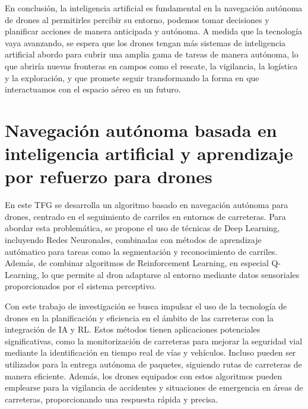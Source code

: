 En conclusión, la inteligencia artificial es fundamental en la navegación autónoma de drones al permitirles percibir su entorno, podemos tomar decisiones y planificar acciones 
de manera anticipada y autónoma. A medida que la tecnología vaya avanzando, se espera que los drones tengan más sistemas de inteligencia artificial abordo para cubrir una amplia gama de tareas
de manera autónoma, lo que abriría nuevas fronteras en campos como el rescate, la vigilancia, la logística y la exploración, y que promete seguir transformando la forma en que 
interactuamos con el espacio aéreo en un futuro. 

\section{Navegación autónoma basada en inteligencia artificial y aprendizaje por refuerzo para drones}
\label{sec:Navegación autónoma}

En este TFG se desarrolla un algoritmo basado en navegación autónoma para drones, centrado en el seguimiento de carriles en entornos de carreteras. Para abordar esta problemática, se propone 
el uso de técnicas de Deep Learning, incluyendo Redes Neuronales, combinadas con métodos de aprendizaje autómatico para tareas como la segmentación y reconocimiento de carriles. Además, 
de combinar algoritmos de Reinforcement Learning, en especial Q-Learning, lo que permite al dron adaptarse al entorno mediante datos sensoriales proporcionados por el sistema perceptivo.

Con este trabajo de investigación se busca impulsar el uso de la tecnología de drones en la planificación y eficiencia en el ámbito de las carreteras con la integración 
de IA y RL. Estos métodos tienen aplicaciones potenciales significativas, como la monitorización de carreteras para mejorar la seguridad vial mediante la identificación en tiempo 
real de vías y vehículos. Incluso pueden ser utilizados para la entrega autónoma de paquetes, siguiendo rutas de carreteras de manera eficiente. Además, los drones equipados 
con estos algoritmos pueden emplearse para la vigilancia de accidentes y situaciones de emergencia en áreas de carreteras, proporcionando una respuesta rápida y precisa.




